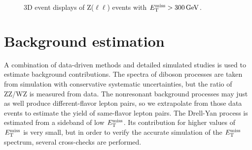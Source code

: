 \clearpage
\begin{figure}[!htb]
\centering
\setlength{\fboxsep}{0pt}
\setlength{\fboxrule}{0.3pt}
\vspace{1cm}

\vspace{1cm}

\caption{3D event displays of Z($\ell\ell$) events with $E_\mathrm{T}^{\mathrm{miss}} > 300 \,\text{Ge\hspace{-.08em}V}$.
\eventDisplayCaption
\label{fig:zllmet_eventdisplay}}
\end{figure}
\clearpage

\section{Background estimation}
\label{sec:dmbkg}
A combination of data-driven methods and detailed simulated studies is used to
estimate background contributions.
The spectra of diboson processes are taken from simulation with conservative systematic uncertainties, but the ratio of ZZ/WZ is measured from data.
The nonresonant background processes may just as well produce different-flavor lepton pairs, so we extrapolate from those data events to estimate the yield of same-flavor lepton pairs.
The Drell-Yan process is estimated from a sideband of low $E_\mathrm{T}^{\mathrm{miss}}$. Its contribution for higher values of $E_\mathrm{T}^{\mathrm{miss}}$ is very small, but in order to verify the accurate simulation of the $E_\mathrm{T}^{\mathrm{miss}}$ spectrum, several cross-checks are performed.


